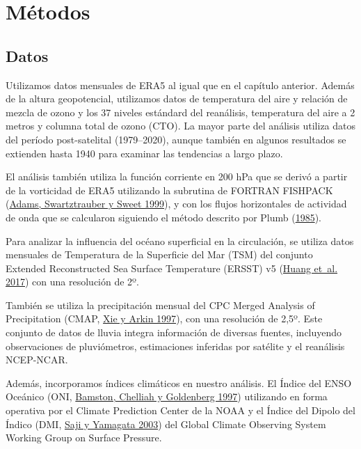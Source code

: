 \documentclass[12pt,oneside,a4paper]{reedthesis}
\begin{document}
\hypertarget{muxe9todos-1}{%
\section{Métodos}\label{muxe9todos-1}}

\hypertarget{datos-1}{%
\subsection{Datos}\label{datos-1}}

Utilizamos datos mensuales de ERA5 al igual que en el capítulo anterior.
Además de la altura geopotencial, utilizamos datos de temperatura del aire y relación de mezcla de ozono y los 37 niveles estándard del reanálisis, temperatura del aire a 2 metros y columna total de ozono (CTO).
La mayor parte del análisis utiliza datos del período post-satelital (1979--2020), aunque también en algunos resultados se extienden hasta 1940 para examinar las tendencias a largo plazo.

El análisis también utiliza la función corriente en 200 hPa que se derivó a partir de la vorticidad de ERA5 utilizando la subrutina de FORTRAN FISHPACK (\protect\hyperlink{ref-fishpack}{Adams, Swartztrauber y Sweet 1999}), y con los flujos horizontales de actividad de onda que se calcularon siguiendo el método descrito por Plumb (\protect\hyperlink{ref-plumb1985}{1985}).

Para analizar la influencia del océano superficial en la circulación, se utiliza datos mensuales de Temperatura de la Superficie del Mar (TSM) del conjunto Extended Reconstructed Sea Surface Temperature (ERSST) v5 (\protect\hyperlink{ref-huang2017}{Huang et~al. 2017}) con una resolución de 2º.

También se utiliza la precipitación mensual del CPC Merged Analysis of Precipitation (CMAP, \protect\hyperlink{ref-xie1997}{Xie y Arkin 1997}), con una resolución de 2,5º.
Este conjunto de datos de lluvia integra información de diversas fuentes, incluyendo observaciones de pluviómetros, estimaciones inferidas por satélite y el reanálisis NCEP-NCAR.

Además, incorporamos índices climáticos en nuestro análisis.
El Índice del ENSO Oceánico (ONI, \protect\hyperlink{ref-bamston1997}{Bamston, Chelliah y Goldenberg 1997}) utilizando en forma operativa por el Climate Prediction Center de la NOAA y el Índice del Dipolo del Índico (DMI, \protect\hyperlink{ref-saji2003}{Saji y Yamagata 2003}) del Global Climate Observing System Working Group on Surface Pressure.
\end{document}
